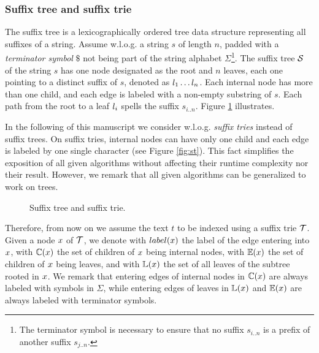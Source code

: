 \subsubsection{Suffix tree and suffix trie}

The suffix tree \citep{Morrison1968} is a lexicographically ordered tree data structure representing all suffixes of a string.
Assume w.l.o.g. a string $s$ of length $n$, padded with a \emph{terminator symbol} $\$$ not being part of the string alphabet $\Sigma$\footnote{The terminator symbol is necessary to ensure that no suffix $s_{i..n}$ is a prefix of another suffix $s_{j..n}$.}.
The suffix tree $\mathcal {S}$ of the string $s$ has one node designated as the root and $n$ leaves, each one pointing to a distinct suffix of $s$, denoted as $l_1 \dots l_n$.
Each internal node has more than one child, and each edge is labeled with a non-empty substring of $s$.
Each path from the root to a leaf $l_i$ spells the suffix $s_{i..n}$.
Figure \ref{fig:stree} illustrates.



In the following of this manuscript we consider w.l.o.g. \emph{suffix tries} instead of suffix trees.
On suffix tries, internal nodes can have only one child and each edge is labeled by one single character (see Figure \ref{fig:st}).
This fact simplifies the exposition of all given algorithms without affecting their runtime complexity nor their result.
However, we remark that all given algorithms can be generalized to work on trees.

\begin{figure}[h]
\caption{Suffix tree and suffix trie.}
\label{fig:stree}
\end{figure}

Therefore, from now on we assume the text $t$ to be indexed using a suffix trie $\mathcal {T}$.
Given a node $x$ of $\mathcal {T}$, we denote with $label(x)$ the label of the edge entering into $x$, with $\mathbb {C}(x)$ the set of children of $x$ being internal nodes, with $\mathbb {E}(x)$ the set of children of $x$ being leaves, and with $\mathbb {L}(x)$ the set of all leaves of the subtree rooted in $x$. We remark that entering edges of internal nodes in $\mathbb {C}(x)$ are always labeled with symbols in $\Sigma$, while entering edges of leaves in $\mathbb {L}(x)$ and $\mathbb {E}(x)$ are always labeled with terminator symbols.

